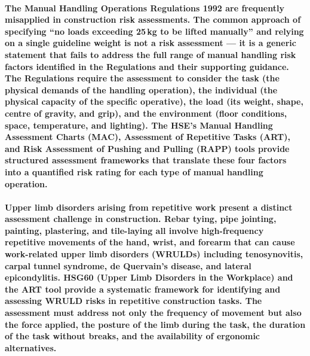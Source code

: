 \paragraph{The Manual Handling Operations Regulations 1992 are frequently misapplied in construction risk assessments. The common approach of specifying ``no loads exceeding 25\,kg to be lifted manually'' and relying on a single guideline weight is not a risk assessment --- it is a generic statement that fails to address the full range of manual handling risk factors identified in the Regulations and their supporting guidance. The Regulations require the assessment to consider the task (the physical demands of the handling operation), the individual (the physical capacity of the specific operative), the load (its weight, shape, centre of gravity, and grip), and the environment (floor conditions, space, temperature, and lighting). The HSE's Manual Handling Assessment Charts (MAC), Assessment of Repetitive Tasks (ART), and Risk Assessment of Pushing and Pulling (RAPP) tools provide structured assessment frameworks that translate these four factors into a quantified risk rating for each type of manual handling operation.}

\paragraph{Upper limb disorders arising from repetitive work present a distinct assessment challenge in construction. Rebar tying, pipe jointing, painting, plastering, and tile-laying all involve high-frequency repetitive movements of the hand, wrist, and forearm that can cause work-related upper limb disorders (WRULDs) including tenosynovitis, carpal tunnel syndrome, de Quervain's disease, and lateral epicondylitis. HSG60 (Upper Limb Disorders in the Workplace) and the ART tool provide a systematic framework for identifying and assessing WRULD risks in repetitive construction tasks. The assessment must address not only the frequency of movement but also the force applied, the posture of the limb during the task, the duration of the task without breaks, and the availability of ergonomic alternatives.}


